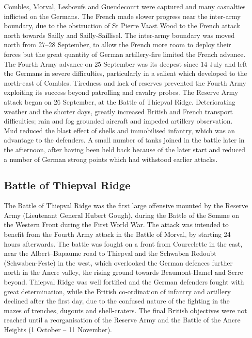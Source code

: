 \documentclass[a4paper,]{book}
\begin{document}
Combles, Morval, Lesbœufs and Gueudecourt were captured and many casualties inflicted on the Germans. The French made slower progress near the inter-army boundary, due to the obstruction of St Pierre Vaast Wood to the French attack north towards Sailly and Sailly-Saillisel. The inter-army boundary was moved north from 27–28 September, to allow the French more room to deploy their forces but the great quantity of German artillery-fire limited the French advance. The Fourth Army advance on 25 September was its deepest since 14 July and left the Germans in severe difficulties, particularly in a salient which developed to the north-east of Combles. Tiredness and lack of reserves prevented the Fourth Army exploiting its success beyond patrolling and cavalry probes. The Reserve Army attack began on 26 September, at the Battle of Thiepval Ridge. Deteriorating weather and the shorter days, greatly increased British and French transport difficulties; rain and fog grounded aircraft and impeded artillery observation. Mud reduced the blast effect of shells and immobilised infantry, which was an advantage to the defenders. A small number of tanks joined in the battle later in the afternoon, after having been held back because of the later start and reduced a number of German strong points which had withstood earlier attacks. 

\subsection{Battle of Thiepval Ridge}

The Battle of Thiepval Ridge was the first large offensive mounted by the Reserve Army (Lieutenant General Hubert Gough), during the Battle of the Somme on the Western Front during the First World War. The attack was intended to benefit from the Fourth Army attack in the Battle of Morval, by starting 24 hours afterwards. The battle was fought on a front from Courcelette in the east, near the Albert–Bapaume road to Thiepval and the Schwaben Redoubt (Schwaben-Feste) in the west, which overlooked the German defences further north in the Ancre valley, the rising ground towards Beaumont-Hamel and Serre beyond. Thiepval Ridge was well fortified and the German defenders fought with great determination, while the British co-ordination of infantry and artillery declined after the first day, due to the confused nature of the fighting in the mazes of trenches, dugouts and shell-craters. The final British objectives were not reached until a reorganisation of the Reserve Army and the Battle of the Ancre Heights (1 October – 11 November).
\end{document}

